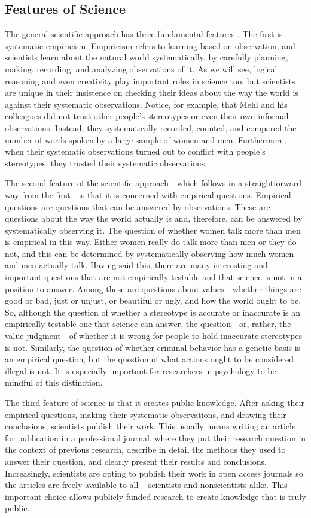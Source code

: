 \subsection{Features of Science}
The general scientific approach has three fundamental features \citep{stanovich_how_2013}. The  first is systematic empiricism. Empiricism refers to learning based on observation, and scientists learn about the natural world systematically, by carefully planning, making, recording, and analyzing observations of it. As we will see, logical reasoning and even creativity play important roles in science too, but scientists are unique in their insistence on checking their ideas about the way the world is against their systematic observations. Notice, for example, that Mehl and his colleagues did not trust other people's stereotypes or even their own informal observations. Instead, they systematically recorded, counted, and compared the number of words spoken by a large sample of women and men. Furthermore, when their systematic observations turned out to conflict with people's stereotypes, they trusted their systematic observations.

The second feature of the scientific approach---which follows in a straightforward way from the first---is that it is concerned with empirical questions. Empirical questions are questions that can be answered by observations. These are questions about the way the world actually is and, therefore, can be answered by systematically observing it. The question of whether women talk more than men is empirical in this way. Either women really do talk more than men or they do not, and this can be determined by systematically observing how much women and men actually talk. Having said this, there are many interesting and important questions that are not empirically testable and that science is not in a position to answer. Among these are questions about values---whether things are good or bad, just or unjust, or beautiful or ugly, and how the world ought to be. So, although the question of whether a stereotype is accurate or inaccurate is an empirically testable one that science can answer, the question---or, rather, the value judgment---of whether it is wrong for people to hold inaccurate stereotypes is not. Similarly, the question of whether criminal behavior has a genetic basis is an empirical question, but the question of what actions ought to be considered illegal is not. It is especially important for researchers in psychology to be mindful of this distinction.

The third feature of science is that it creates public knowledge. After asking their empirical questions, making their systematic observations, and drawing their conclusions, scientists publish their work. This usually means writing an article for publication in a professional journal, where they put their research question in the context of previous research, describe in detail the methods they used to answer their question, and clearly present their results and conclusions. Increasingly, scientists are opting to publish their work in open access journals so the articles are freely available to all -- scientists and nonscientists alike. This important choice allows publicly-funded research to create knowledge that is truly public.

